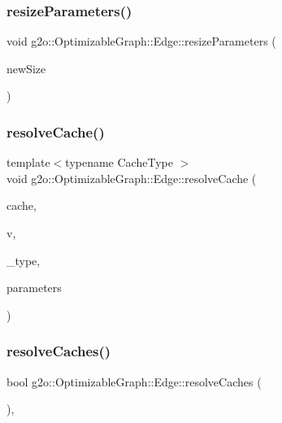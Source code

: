 \subsubsection{\texorpdfstring{resize\+Parameters()}{resizeParameters()}}
{\footnotesize\ttfamily void g2o\+::\+Optimizable\+Graph\+::\+Edge\+::resize\+Parameters (\begin{DoxyParamCaption}\item[{size\+\_\+t}]{new\+Size }\end{DoxyParamCaption})\hspace{0.3cm}{\ttfamily [inline]}}

\mbox{\label{classg2o_1_1_optimizable_graph_1_1_edge_ad95f2883af693de56e46a2b272dc1cdc}} 
\subsubsection{\texorpdfstring{resolve\+Cache()}{resolveCache()}}
{\footnotesize\ttfamily template$<$typename Cache\+Type $>$ \\
void g2o\+::\+Optimizable\+Graph\+::\+Edge\+::resolve\+Cache (\begin{DoxyParamCaption}\item[{Cache\+Type $\ast$\&}]{cache,  }\item[{\mbox{\hyperlink{classg2o_1_1_optimizable_graph_1_1_vertex}{Optimizable\+Graph\+::\+Vertex}} $\ast$}]{v,  }\item[{const std\+::string \&}]{\+\_\+type,  }\item[{const \mbox{\hyperlink{namespaceg2o_a85cc8f2c7db8cab47b2b269a7acd6785}{Parameter\+Vector}} \&}]{parameters }\end{DoxyParamCaption})\hspace{0.3cm}{\ttfamily [protected]}}

\mbox{\label{classg2o_1_1_optimizable_graph_1_1_edge_aa93e3a4f976b467994f4eb7679a04bf3}} 
\subsubsection{\texorpdfstring{resolve\+Caches()}{resolveCaches()}}
{\footnotesize\ttfamily bool g2o\+::\+Optimizable\+Graph\+::\+Edge\+::resolve\+Caches (\begin{DoxyParamCaption}{ }\end{DoxyParamCaption})\hspace{0.3cm}{\ttfamily [protected]}, {\ttfamily [virtual]}}

